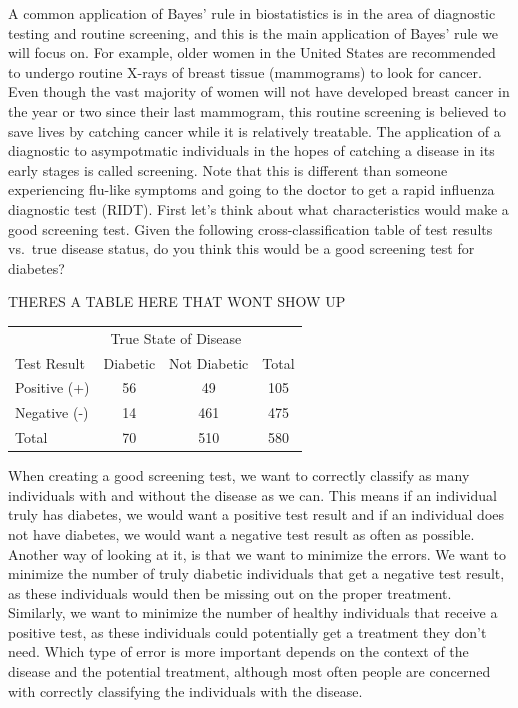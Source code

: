 \documentclass[
]{book}
\theoremstyle{definition}
\theoremstyle{definition}
\theoremstyle{definition}
\theoremstyle{remark}
\begin{document}
A common application of Bayes' rule in biostatistics is in the area of diagnostic testing and routine screening, and this is the main application of Bayes' rule we will focus on. For example, older women in the United States are recommended to undergo routine X-rays of breast tissue (mammograms) to look for cancer. Even though the vast majority of women will not have developed breast cancer in the year or two since their last mammogram, this routine screening is believed to save lives by catching cancer while it is relatively treatable. The application of a diagnostic to asympotmatic individuals in the hopes of catching a disease in its early stages is called screening. Note that this is different than someone experiencing flu-like symptoms and going to the doctor to get a rapid influenza diagnostic test (RIDT). First let's think about what characteristics would make a good screening test. Given the following cross-classification table of test results vs.~true disease status, do you think this would be a good screening test for diabetes?

THERES A TABLE HERE THAT WONT SHOW UP

\begin{tabular}{l|cc|c}
\hline
                                 & \multicolumn{2}{c|}{True State of Disease}    & \multicolumn{1}{l}{} \\ 
\multicolumn{1}{l|}{Test Result} & Diabetic & \multicolumn{1}{c|}{Not Diabetic} & Total                \\ \hline
\multicolumn{1}{l|}{Positive (+)}    & 56       & \multicolumn{1}{c|}{49}           & 105                  \\
\multicolumn{1}{l|}{Negative (-)}    & 14       & \multicolumn{1}{c|}{461}          & 475                  \\ \hline
\multicolumn{1}{l|}{Total}       & 70       & \multicolumn{1}{c|}{510}          & 580                 
\end{tabular}

When creating a good screening test, we want to correctly classify as many individuals with and without the disease as we can. This means if an individual truly has diabetes, we would want a positive test result and if an individual does not have diabetes, we would want a negative test result as often as possible. Another way of looking at it, is that we want to minimize the errors. We want to minimize the number of truly diabetic individuals that get a negative test result, as these individuals would then be missing out on the proper treatment. Similarly, we want to minimize the number of healthy individuals that receive a positive test, as these individuals could potentially get a treatment they don't need. Which type of error is more important depends on the context of the disease and the potential treatment, although most often people are concerned with correctly classifying the individuals with the disease.
\end{document}
